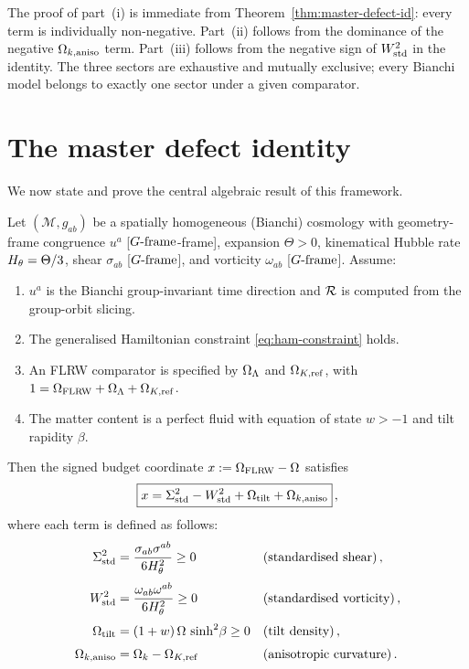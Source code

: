 \noindent
The proof of part~(i) is immediate from
Theorem~\ref{thm:master-defect-id}: every term is individually
non-negative.  Part~(ii) follows from the dominance of the
negative $\Omega_{k,\mathrm{aniso}}$ term.  Part~(iii) follows from the
negative sign of $W^2_{\mathrm{std}}$ in the identity.  The three sectors
are exhaustive and mutually exclusive; every Bianchi model
belongs to exactly one sector under a given comparator.


\section{The master defect identity}\label{sec:master-id}

We now state and prove the central algebraic result of this
framework.

\begin{theorem}
\label{thm:master-defect-id}
Let $(\mathcal{M}, g_{ab})$ be a spatially homogeneous
(Bianchi) cosmology with geometry-frame congruence $u^a$
[$G\text{-frame}$-frame],
expansion $\Theta > 0$, kinematical Hubble rate
$H_\theta = \Theta/3$, shear $\sigma_{ab}$ [$G\text{-frame}$], and
vorticity $\omega_{ab}$ [$G\text{-frame}$].  Assume:
\begin{enumerate}
\item[\emph{(i)}] $u^a$ is the Bianchi group-invariant time
  direction and $\mathcal{R}$ is computed from the group-orbit slicing.
\item[\emph{(ii)}] The generalised Hamiltonian constraint
  \eqref{eq:ham-constraint} holds.
\item[\emph{(iii)}] An FLRW comparator is specified by
  $\Omega_\Lambda$ and $\Omega_{K,\mathrm{ref}}$, with
  $1 = \Omega_{\mathrm{FLRW}} + \Omega_\Lambda + \Omega_{K,\mathrm{ref}}$.
\item[\emph{(iv)}] The matter content is a perfect fluid with
  equation of state $w > -1$ and tilt rapidity $\beta$.
\end{enumerate}
Then the signed budget coordinate $x := \Omega_{\mathrm{FLRW}} - \Omega$ satisfies
\begin{equation}\label{eq:master-identity}
\boxed{x = \Sigma^2_{\mathrm{std}} - W^2_{\mathrm{std}} + \Omega_{\mathrm{tilt}} + \Omega_{k,\mathrm{aniso}}}\,,
\end{equation}
where each term is defined as follows:
\begin{align}
\Sigma^2_{\mathrm{std}} &= \frac{\sigma_{ab}\sigma^{ab}}{6H_\theta^2} \geq 0
  &&\text{(standardised shear)}\,,
  \label{eq:Sigstd-id}\\[3pt]
W^2_{\mathrm{std}} &= \frac{\omega_{ab}\omega^{ab}}{6H_\theta^2} \geq 0
  &&\text{(standardised vorticity)}\,,
  \label{eq:Wstd-id}\\[3pt]
\Omega_{\mathrm{tilt}} &= (1+w)\,\Omega\,\sinh^2\!\beta \geq 0
  &&\text{(tilt density)}\,,
  \label{eq:Otilt-def}\\[3pt]
\Omega_{k,\mathrm{aniso}} &= \Omega_k - \Omega_{K,\mathrm{ref}}
  &&\text{(anisotropic curvature)}\,.
  \label{eq:Oka-def}
\end{align}
\end{theorem}


